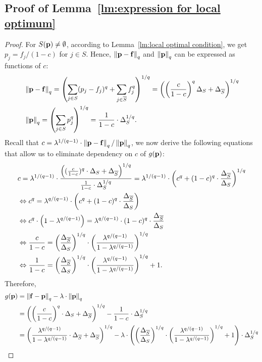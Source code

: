 \subsection{Proof of Lemma~\ref{lm:expression for local optimum}}
\begin{proof}
For $S(\mathbf{p})\neq\emptyset$, according to Lemma~\ref{lm:local optimal condition}, we get $p_j=f_j/(1-c)$ for $j\in S$. Hence, $\left\Vert \mathbf{p}-\mathbf{f}\right\Vert_{q}$ and $\left\Vert \mathbf{p}\right\Vert_{q}$ can be expressed as functions of $c$:
\begin{equation*}
\begin{split}
&\left\Vert \mathbf{p}-\mathbf{f}\right\Vert_{q}=\left(\sum_{j\in S}(p_j-f_j)^q+\sum_{j\in \overline{S}}f_j^q\right)^{1/q}=\left(\left(\frac{c}{1-c}\right)^q\Delta_{{S}}+{\Delta_{{\overline{S}}}}\right)^{1/q}\\
&\left\Vert \mathbf{p}\right\Vert_{q}=\left(\sum_{j\in S}p_j^q\right)^{1/q}=\frac{1}{1-c}\cdot\Delta_{{S}}^{1/q}.
\end{split}
\end{equation*}
Recall that $c=\lambda^{1/(q-1)}\cdot\left\Vert \mathbf{p}-\mathbf{f}\right\Vert_{q}/\left\Vert \mathbf{p}\right\Vert_{q}$, we now derive the following equations that allow us to eliminate dependency on $c$ of $g(\mathbf{p})$:
\begin{align*}
&c=\lambda^{1/(q-1)}\cdot\frac{\left((\frac{c}{1-c})^q\cdot\Delta_{{S}}+{\Delta_{{\overline{S}}}}\right)^{1/q}}{\frac{1}{1-c}\cdot\Delta_{S}^{1/q}}=\lambda^{1/(q-1)}\cdot\left(c^q+(1-c)^q\cdot\frac{{\Delta_{{\overline{S}}}}}{\Delta_{{S}}}\right)^{1/q}\\
&\Leftrightarrow c^q=\lambda^{q/(q-1)}\cdot\left(c^q+(1-c)^q\cdot\frac{{\Delta_{{\overline{S}}}}}{\Delta_{{S}}}\right)\\
&\Leftrightarrow c^q\cdot\left(1-\lambda^{q/(q-1)}\right)=\lambda^{q/(q-1)}\cdot(1-c)^q\cdot\frac{{\Delta_{{\overline{S}}}}}{\Delta_{{S}}}\\
&\Leftrightarrow\frac{c}{1-c}=\left(\frac{{\Delta_{{\overline{S}}}}}{\Delta_{{S}}}\right)^{1/q}\cdot\left(\frac{\lambda^{q/(q-1)}}{1-\lambda^{q/(q-1)}}\right)^{1/q}\\
&\Leftrightarrow\frac{1}{1-c}=\left(\frac{{\Delta_{{\overline{S}}}}}{\Delta_{{S}}}\right)^{1/q}\cdot\left(\frac{\lambda^{q/(q-1)}}{1-\lambda^{q/(q-1)}}\right)^{1/q}+1.
\end{align*}
Therefore,
\begin{align*}
g(\loc)&=\qnorm{\facility-\loc}-\lambda\cdot\qnorm{\loc}\\
&=\left(\left(\frac{c}{1-c}\right)^q\cdot\energy+\energyc\right)^{1/q}-\frac{1}{1-c}\cdot\energy^{1/q}\\
&=\left(\frac{\lambda^{q/(q-1)}}{1-\lambda^{q/(q-1)}}\cdot\energyc+\energyc\right)^{1/q}-\lambda\cdot\left(\left(\frac{\energyc}{\energy}\right)^{1/q}\cdot\left(\frac{\lambda^{q/(q-1)}}{1-\lambda^{q/(q-1)}}\right)^{1/q}+1\right)\cdot \energy^{1/q}\\

\end{align*}
\end{proof}
